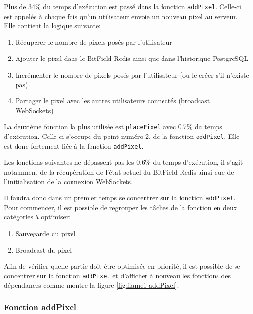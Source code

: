 Plus de 34\% du temps d'exécution est passé dans la fonction \texttt{addPixel}. Celle-ci est appelée à chaque fois qu'un utilisateur envoie un nouveau pixel au serveur. Elle contient la logique suivante:

\begin{enumerate}
  \item Récupérer le nombre de pixels posés par l'utilisateur
  \item Ajouter le pixel dans le BitField Redis ainsi que dans l'historique PostgreSQL
  \item Incrémenter le nombre de pixels posés par l'utilisateur (ou le créer s'il n'existe pas)
  \item Partager le pixel avec les autres utilisateurs connectés (broadcast WebSockets)
\end{enumerate}

La deuxième fonction la plus utilisée est \texttt{placePixel} avec 0.7\% du temps d'exécution. Celle-ci s'occupe du point numéro 2. de la fonction \texttt{addPixel}. Elle est donc fortement liée à la fonction \texttt{addPixel}.

Les fonctions suivantes ne dépassent pas les 0.6\% du temps d'exécution, il s'agit notamment de la récupération de l'état actuel du BitField Redis ainsi que de l'initialisation de la connexion WebSockets.

Il faudra donc dans un premier temps se concentrer sur la fonction \texttt{addPixel}. Pour commencer, il est possible de regrouper les tâches de la fonction en deux catégories à optimiser:

\begin{enumerate}
  \item Sauvegarde du pixel
  \item Broadcast du pixel
\end{enumerate}

Afin de vérifier quelle partie doit être optimisée en priorité, il est possible de se concentrer sur la fonction \texttt{addPixel} et d'afficher à nouveau les fonctions des dépendances comme montre la figure \ref{fig:flame1-addPixel}.

\subsubsection{Fonction addPixel}

